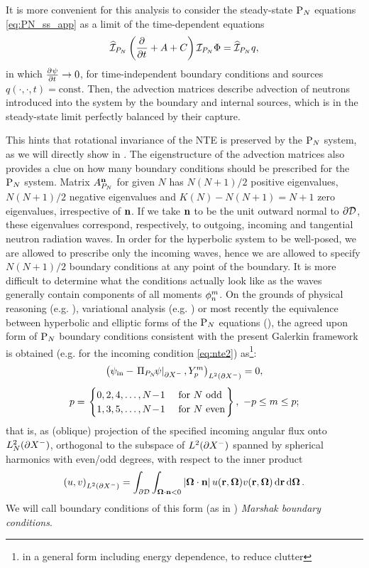 It is more convenient for this analysis to consider the steady-state $\PN$ equations \eqref{eq:PN_ss_app} as a limit of the 
time-dependent equations
\begin{equation}\label{eq:PN_ss_app}
	\PihPN \left(\pd{}{t} + A + C\right) \PiPN\Phi = \PihPN q,
\end{equation}
in which $\pd{\psi}{t} \to 0$, for time-independent boundary conditions and sources
\linebreak[4]\mbox{$q(\cdot,\cdot,t) = \text{const}$}.
Then, the advection matrices describe advection of neutrons introduced into the system by the boundary and internal
sources, which is in the steady-state limit perfectly balanced by their capture.

This hints that rotational invariance of the NTE is preserved by the $\PN$ system, as we will directly show in 
. The eigenstructure of the advection matrices also provides a clue on how many boundary conditions
should be prescribed for the $\PN$ system. Matrix $A_{P_N}^{\bn}$ for given $N$ has
$N(N+1)/2$ positive eigenvalues, $N(N+1)/2$ negative eigenvalues and $K(N) - N(N+1) = N+1$ zero eigenvalues,
irrespective of $\bn$. If we take $\bn$ to be the unit outward normal to $\pV$, these eigenvalues correspond,
respectively, to outgoing, incoming and tangential neutron radiation waves. In order for the hyperbolic system to be
well-posed, we are allowed to prescribe only the incoming waves, hence we are allowed to specify $N(N+1)/2$ boundary
conditions at any point of the boundary. It is more difficult to determine what the conditions actually look like as the
waves generally contain components of all moments $\angmom{n}{m}$. On the grounds of physical reasoning
(e.g. \cite{Rumyantsev}), variational analysis (e.g. \cite{Davis}) or most recently the equivalence between hyperbolic
and elliptic forms of the $\PN$ equations (\cite{Sanchez8}), the agreed upon form of $\PN$ boundary conditions
consistent with the present Galerkin framework is obtained (e.g. for the incoming condition \eqref{eq:nte2})
as\footnote{in a general form including energy dependence, to reduce clutter}:
$$
\begin{gathered}
	\left(\psi_\text{in} - \left.\Projop[P_N]\!\psi\right\vert_{\pX[-]}, \Y{p}{m} \right)_{\Lp[2](\pX[-])} = 0,\\[.35em] 
	p = 
	\left.\begin{cases}
		0,2,4,\ldots,N\!-\!1 & \mbox{ for $N$ odd}\\
		1,3,5,\ldots,N\!-\!1 & \mbox{ for $N$ even}	
	\end{cases}\right\},\ -p \leq m \leq p;
\end{gathered}
$$
that is, as (oblique) projection of the specified incoming angular flux onto $\Lp[2]_N(\pX[-])$, orthogonal
to the subspace of $\Lp[2](\pX[-])$ spanned by spherical harmonics with even/odd degrees, with respect to the inner
product
$$
	\left(u,v\right)_{\Lp[2](\pX[-])} = \int_{\pV}\int_{\bomega\cdot\bn < 0}\abs{\bomega\cdot\bn}
	u(\br,\bomega)v(\br,\bomega)\,\d{\br}\d{\bomega}.
$$
 We will call boundary conditions of this form (as in \cite{Davis}) \textit{Marshak boundary
conditions}.

